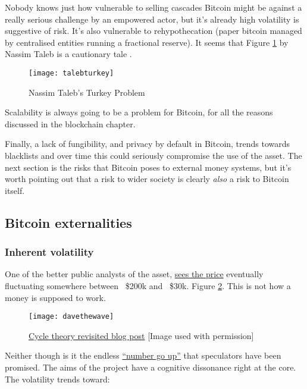 Nobody knows just how vulnerable to selling cascades Bitcoin might be against a really serious challenge by an empowered actor, but it's already high volatility is suggestive of risk. It's also vulnerable to rehypothecation (paper bitcoin managed by centralised entities running a fractional reserve). It seems that Figure \ref{fig:talebturkey} by  Nassim Taleb is a cautionary tale \cite{taleb2012antifragile}.
\begin{figure}
  \centering
    \texttt{[image: talebturkey]}
  \caption{Nassim Taleb's Turkey Problem}
  \label{fig:talebturkey}
\end{figure}

Scalability is always going to be a problem for Bitcoin, for all the reasons discussed in the blockchain chapter.\par 
Finally, a lack of fungibility, and privacy by default in Bitcoin, trends towards blacklists and over time this could seriously compromise the use of the asset. The next section is the risks that Bitcoin poses to external money systems, but it's worth pointing out that a risk to wider society is clearly \textit{also} a risk to Bitcoin itself.
\subsection{Bitcoin externalities}
\subsubsection{Inherent volatility}
One of the better public analysts of the asset, \href{https://twitter.com/davthewave/status/1072441941390974982/photo/1}{sees the price} eventually fluctuating somewhere between ~\$200k and ~\$30k.  Figure \ref{fig:davethewave}. This is not how a money is supposed to work. 

\begin{figure}
  \centering
    \texttt{[image: davethewave]}
  \caption{\href{https://davethewave.substack.com/p/cycle-theory-revisited?s=r}{Cycle theory revisited blog post} [Image used with permission]}
  \label{fig:davethewave}
\end{figure}

Neither though is it the endless \href{https://stephanlivera.com/episode/147/}{``number go up''} that speculators have been promised. The aims of the project have a cognitive dissonance right at the core. The volatility trends toward:
